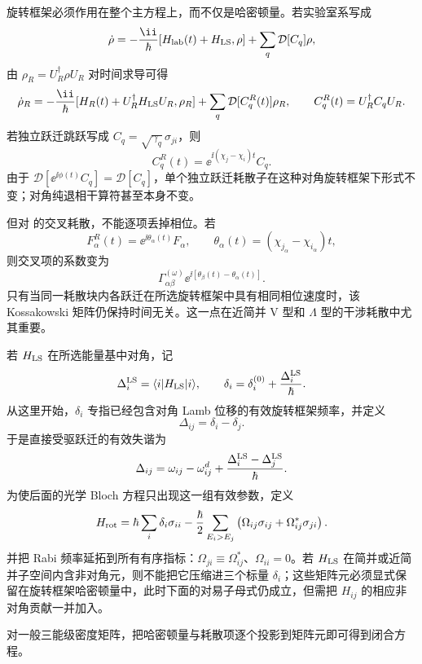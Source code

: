 旋转框架必须作用在整个主方程上，而不仅是哈密顿量。若实验室系写成
\[
\dot\rho
=-\frac{\ii}{\hbar}[H_{\rm lab}(t)+H_{\rm LS},\rho]
+\sum_q\mathcal D[C_q]\rho,
\]
由 $\rho_R=U_R^\dagger\rho U_R$ 对时间求导可得
\begin{equation}
\dot\rho_R
=-\frac{\ii}{\hbar}
[H_R(t)+U_R^\dagger H_{\rm LS}U_R,\rho_R]
+\sum_q\mathcal D[C_q^{R}(t)]\rho_R,
\qquad
C_q^{R}(t)=U_R^\dagger C_qU_R.
\label{eq:phys-oqs-rotating-frame-master}
\end{equation}
若独立跃迁跳跃写成 $C_q=\sqrt{\gamma_q}\,\sigma_{ji}$，则
\[
C_q^{R}(t)
=\ee^{\ii(\chi_j-\chi_i)t}C_q.
\]
由于 $\mathcal D[\ee^{\ii\phi(t)}C_q]=\mathcal D[C_q]$，单个独立跃迁耗散子在这种对角旋转框架下形式不变；对角纯退相干算符甚至本身不变。

但对 的交叉耗散，不能逐项丢掉相位。若
\[
F_\alpha^R(t)=\ee^{\ii\theta_\alpha(t)}F_\alpha,
\qquad
\theta_\alpha(t)=(\chi_{j_\alpha}-\chi_{i_\alpha})t,
\]
则交叉项的系数变为
\[
\Gamma_{\alpha\beta}^{(\omega)}
\ee^{\ii[\theta_\beta(t)-\theta_\alpha(t)]}.
\]
只有当同一耗散块内各跃迁在所选旋转框架中具有相同相位速度时，该 Kossakowski 矩阵仍保持时间无关。这一点在近简并 V 型和 $\Lambda$ 型的干涉耗散中尤其重要。

若 $H_{\rm LS}$ 在所选能量基中对角，记
\[
\Delta_i^{\rm LS}=\langle i|H_{\rm LS}|i\rangle,
\qquad
\delta_i=\delta_i^{(0)}+\frac{\Delta_i^{\rm LS}}{\hbar}.
\]
从这里开始，$\delta_i$ 专指已经包含对角 Lamb 位移的有效旋转框架频率，并定义
\begin{equation}
\Delta_{ij}=\delta_i-\delta_j.
\label{eq:phys-oqs-three-detuning}
\end{equation}
于是直接受驱跃迁的有效失谐为
\[
\Delta_{ij}
=\omega_{ij}-\omega_{ij}^{d}
+\frac{\Delta_i^{\rm LS}-\Delta_j^{\rm LS}}{\hbar}.
\]
为使后面的光学 Bloch 方程只出现这一组有效参数，定义
\begin{equation}
H_{\rm rot}
=\hbar\sum_i\delta_i\sigma_{ii}
-\frac{\hbar}{2}\sum_{E_i>E_j}
\left(\Omega_{ij}\sigma_{ij}+\Omega_{ij}^*\sigma_{ji}\right).
\label{eq:phys-oqs-three-hrot}
\end{equation}
并把 Rabi 频率延拓到所有有序指标：$\Omega_{ji}\equiv\Omega_{ij}^*$、$\Omega_{ii}=0$。若 $H_{\rm LS}$ 在简并或近简并子空间内含非对角元，则不能把它压缩进三个标量 $\delta_i$；这些矩阵元必须显式保留在旋转框架哈密顿量中，此时下面的对易子母式仍成立，但需把 $H_{ij}$ 的相应非对角贡献一并加入。

对一般三能级密度矩阵，把哈密顿量与耗散项逐个投影到矩阵元即可得到闭合方程。

